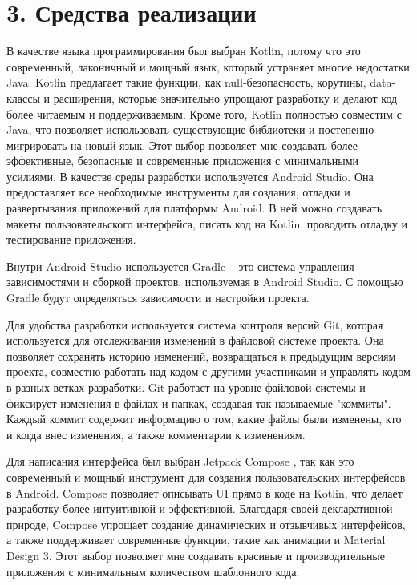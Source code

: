 \documentclass{vsureport}
\begin{document}
\newpage 
\section*{3. Средства реализации}

В качестве языка программирования был выбран Kotlin, потому что это современный, лаконичный и мощный язык, который устраняет многие недостатки Java. Kotlin предлагает такие функции, как null-безопасность, корутины, data-классы и расширения, которые значительно упрощают разработку и делают код более читаемым и поддерживаемым. Кроме того, Kotlin полностью совместим с Java, что позволяет использовать существующие библиотеки и постепенно мигрировать на новый язык. Этот выбор позволяет мне создавать более эффективные, безопасные и современные приложения с минимальными усилиями. В качестве среды разработки используется Android Studio. Она предоставляет все необходимые инструменты для создания, отладки и развертывания приложений для платформы Android. В ней можно создавать макеты пользовательского интерфейса, писать код на Kotlin, проводить отладку и тестирование приложения.

Внутри Android Studio используется Gradle – это система управления зависимостями и сборкой проектов, используемая в Android Studio. С помощью Gradle будут определяться зависимости и настройки проекта. \cite{ref4}

Для удобства разработки используется система контроля версий Git, которая используется для отслеживания изменений в файловой системе проекта. Она позволяет сохранять историю изменений, возвращаться к предыдущим версиям проекта, совместно работать над кодом с другими участниками и управлять кодом в разных ветках разработки. Git работает на уровне файловой системы и фиксирует изменения в файлах и папках, создавая так называемые "коммиты". Каждый коммит содержит информацию о том, какие файлы были изменены, кто и когда внес изменения, а также комментарии к изменениям. \cite{ref4}

Для написания интерфейса был выбран Jetpack Compose \cite{ref5}\cite{ref6}, так как это современный и мощный инструмент для создания пользовательских интерфейсов в Android. Compose позволяет описывать UI прямо в коде на Kotlin, что делает разработку более интуитивной и эффективной. Благодаря своей декларативной природе, Compose упрощает создание динамических и отзывчивых интерфейсов, а также поддерживает современные функции, такие как анимации и Material Design 3. Этот выбор позволяет мне создавать красивые и производительные приложения с минимальным количеством шаблонного кода.
\end{document}
